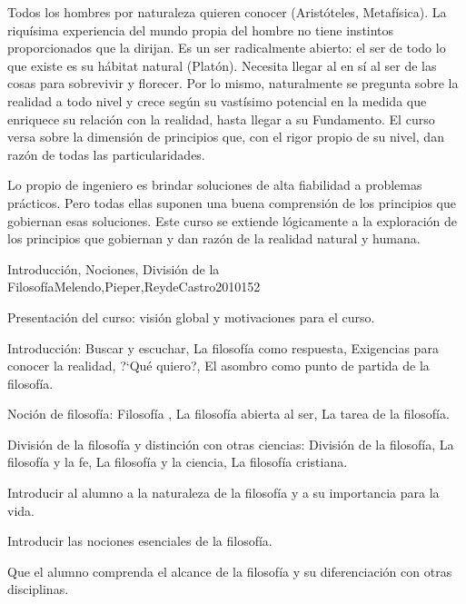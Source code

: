 \begin{syllabus}


\begin{justification}
Todos los hombres por naturaleza quieren conocer  (Aristóteles, Metafísica). La riquísima experiencia del mundo propia del hombre no tiene instintos proporcionados que la dirijan. Es un ser radicalmente abierto: el ser de todo lo que existe es su  hábitat  natural (Platón). Necesita llegar al  en sí al ser de las cosas para sobrevivir y florecer. Por lo mismo, naturalmente se pregunta sobre la realidad a todo nivel y crece según su vastísimo potencial en la medida que enriquece su relación con la realidad, hasta llegar a su Fundamento. El curso versa sobre la dimensión de principios que, con el rigor propio de su nivel, dan razón de todas las particularidades.
\end{justification}

\begin{goals}
\item Lo propio de ingeniero es brindar soluciones de alta fiabilidad a problemas prácticos. Pero todas ellas suponen una buena comprensión de los principios que gobiernan esas soluciones. Este curso se extiende lógicamente a la exploración de los principios que gobiernan y dan razón de la realidad natural y humana.
\end{goals}

\begin{outcomes}
\end{outcomes}

\begin{unit}{Introducción, Nociones, División de la Filosofía}{Melendo,Pieper,ReydeCastro2010}{15}{2}
\begin{topics}
	\item Presentación del curso: visión global y motivaciones para el curso.
	\item Introducción: Buscar y escuchar, La filosofía como respuesta, Exigencias para conocer la realidad, ?`Qué quiero?, El asombro como punto de partida de la filosofía.
	\item Noción de filosofía:  Filosofía , La filosofía abierta al ser, La tarea de la filosofía.
	\item División de la filosofía y distinción con otras ciencias: División de la filosofía, La filosofía y la fe, La filosofía y la ciencia,  La filosofía cristiana.
\end{topics}
\begin{learningoutcomes}
	\item Introducir al alumno a la naturaleza de la filosofía y a su importancia para la vida.
	\item Introducir las nociones esenciales de la filosofía.
	\item Que el alumno comprenda el alcance de la filosofía y su diferenciación con otras disciplinas.
\end{learningoutcomes}
\end{unit}


\end{syllabus}
